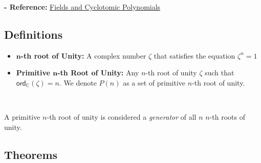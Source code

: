 \textbf{- Reference:} 
\href{https://e.math.cornell.edu/people/belk/numbertheory/CyclotomicPolynomials.pdf}{Fields and Cyclotomic Polynomials}~\cite{cyclotomic-polynomial}


\subsection{Definitions}
\label{subsec:roots-def}
\begin{tcolorbox}[title={\textbf{\tboxdef{\ref*{subsec:roots-def}} Definitions for Roots of Unity}}]
\begin{itemize}
\item \textbf{$\bm{n}$-th root of Unity:} A complex number $\zeta$ that satisfies the equation $\zeta^n = 1$
\item \textbf{Primitive $\bm{n}$-th Root of Unity:} Any $n$-th root of unity $\zeta$ such that $\textsf{ord}_\mathbb{C}(\zeta) = n$. We denote $P(n)$ as a set of primitive $n$-th root of unity. 
\end{itemize}

$ $

A primitive $n$-th root of unity is considered a \textit{generator} of all $n$ $n$-th roots of unity.
\end{tcolorbox}

\subsection{Theorems}
\label{subsec:roots-theorem}


